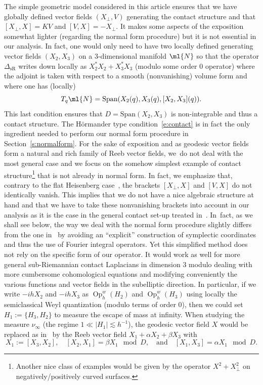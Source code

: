 \documentclass[JEP,XML,SOM,Unicode, NoEqCountersInSection,published]{cedram}
\theoremstyle{plain}
\theoremstyle{definition}
\theoremstyle{remark}
\newcommand{\Op}{\operatorname{Op}}
\begin{document}
The simple geometric model considered in this article ensures that we have globally defined vector fields $(X_\perp,V)$ generating the contact structure and that $[X_\perp,X]= KV$ and $[V,X]=-X_\perp$. It makes some aspects of the exposition somewhat lighter (\eg regarding the normal form procedure) but it is not essential in our analysis. In fact, one would only need to have two locally defined generating vector fields $(X_2,X_3)$ on a $3$-dimensional manifold $\ml{N}$ so that the operator $\Delta_{\text{sR}}$ writes down locally as $X_2^*X_2+X_3^*X_3$ (modulo some order $0$ operator) where the adjoint is taken with respect to a smooth (nonvanishing) volume form and where one has (locally)
\begin{equation}\label{e:contact}T_q\ml{N}=\text{Span}(X_2(q),X_3(q),[X_2,X_3](q)).\end{equation}
This last condition ensures that $D=\text{Span}(X_2,X_3)$ is non-integrable and thus a contact structure. The Hörmander type condition~\eqref{e:contact} is in fact the only ingredient needed to perform our normal form procedure in Section~\ref{s:normalform}. For the sake of exposition and as geodesic vector fields form a natural and rich family of Reeb vector fields, we~do not deal with the most general case and we focus on the somehow simplest example of contact structure\footnote{Another nice class of examples would be given by the operator $X^2+X_\perp^2$ on negatively/positively curved surfaces.} that is not already in normal form. In fact, we emphasize that, contrary to the flat Heisenberg case~\cite{ColindeVerdiereHillairetTrelat15, FermanianFischer21, FermanianLetrouit20}, the brackets $[X_\perp,X]$ and $[V,X]$ do not identically vanish. This implies that we do not have a nice algebraic structure at hand and that we have to take these nonvanishing brackets into account in our analysis as it is the case in the general contact set-up treated in~\cite{ColindeVerdiereHillairetTrelat15}. In~fact, as we shall see below, the way we deal with the normal form procedure slightly differs from the one in~\cite{ColindeVerdiereHillairetTrelat15} by avoiding an ``explicit'' construction of symplectic coordinates and thus the use of Fourier integral operators. Yet this simplified method does not rely on the specific form of our operator. It would work as well for more general sub-Riemannian contact Laplacians in dimension $3$ modulo dealing with more cumbersome cohomological equations and modifying conveniently the various functions and vector fields in the subelliptic direction. In particular, if we write $-ihX_2$ and $-ihX_3$ as $\Op^w_h(H_2)$ and $ \Op^w_h(H_3)$ using locally the semiclassical Weyl quantization (modulo terms of order $0$), then we could set $H_1:=\{H_3,H_2\}$ to measure the escape of mass at infinity. When studying the measure $\nu_\infty$ (\ie the regime $1\ll |H_1|\lesssim h^{-1}$), the geodesic vector field $X$ would be replaced as in~\cite{ColindeVerdiereHillairetTrelat15} by the Reeb vector field $X_1+\alpha X_2+\beta X_3$ with
\[
X_1:=[X_3,X_2],\quad [X_2,X_1]=\beta X_1 \mod D,\quad \text{and}\quad [X_1,X_3]=\alpha X_1 \mod D.
\]
\end{document}
